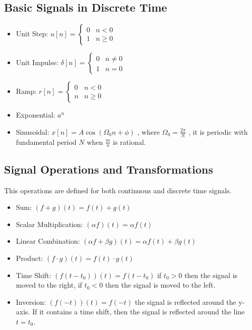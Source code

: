 \documentclass[letterpaper]{article}
\begin{document}
\begin{multicols}{2}
        \subsection{Basic Signals in Discrete Time}

        \begin{itemize}
            \item Unit Step: $u[n] = \begin{cases} 0 & n < 0 \\ 1 & n \geq 0 \end{cases}$
            \item Unit Impulse: $\delta[n] = \begin{cases} 0 & n \neq 0 \\ 1 & n = 0 \end{cases}$
            \item Ramp: $r[n] = \begin{cases} 0 & n < 0 \\ n & n \geq 0 \end{cases}$
            \item Exponential: $a^n$
            \item Sinusoidal: $x[n] = A \cos{(\Omega_0 n + \phi)}$ , where $\Omega_0 = \frac{2\pi}{N}$ , it is periodic with fundamental period $N$ when $\frac{m}{n}$ is rational.
        \end{itemize}

        \subsection{Signal Operations and Transformations}

        This operations are defined for both continuous and discrete time signals.

        \begin{itemize}
            \item Sum: $(f+g)(t) = f(t) + g(t)$
            \item Scalar Multiplication: $(\alpha f)(t) = \alpha f(t)$
            \item Linear Combination: $(\alpha f + \beta g)(t) = \alpha f(t) + \beta g(t)$
            \item Product: $(f \cdot g)(t) = f(t) \cdot g(t)$
            \item Time Shift: $(f(t-t_0))(t) = f(t-t_0)$ if $t_0 > 0$ then the signal is moved to the right, if $t_0 < 0$ then the signal is moved to the left.
            \item Inversion: $(f(-t))(t) = f(-t)$ the signal is reflected around the y-axis. If it contains a time shift, then the signal is reflected around the line $t = t_0$.
        \end{itemize}


\end{multicols}
\end{document}
